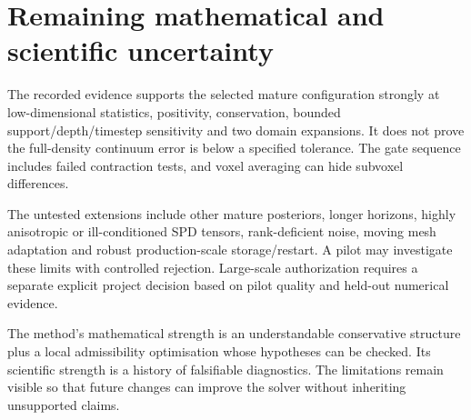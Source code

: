 \section{Remaining mathematical and scientific uncertainty}
The recorded evidence supports the selected mature configuration strongly at low-dimensional statistics, positivity, conservation, bounded support/depth/timestep sensitivity and two domain expansions. It does not prove the full-density continuum error is below a specified tolerance. The gate sequence includes failed contraction tests, and voxel averaging can hide subvoxel differences.

The untested extensions include other mature posteriors, longer horizons, highly anisotropic or ill-conditioned SPD tensors, rank-deficient noise, moving mesh adaptation and robust production-scale storage/restart. A pilot may investigate these limits with controlled rejection. Large-scale authorization requires a separate explicit project decision based on pilot quality and held-out numerical evidence.

The method's mathematical strength is an understandable conservative structure plus a local admissibility optimisation whose hypotheses can be checked. Its scientific strength is a history of falsifiable diagnostics. The limitations remain visible so that future changes can improve the solver without inheriting unsupported claims.
